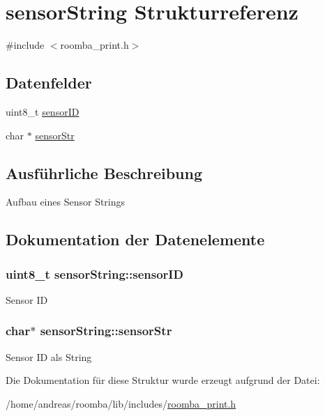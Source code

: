 \hypertarget{structsensorString}{\section{sensor\-String Strukturreferenz}
\label{structsensorString}
}


{\ttfamily \#include $<$roomba\-\_\-print.\-h$>$}

\subsection*{Datenfelder}
\begin{DoxyCompactItemize}
\item 
uint8\-\_\-t \hyperlink{structsensorString_a5a7f5dbee074486a9d560888b2a43fee}{sensor\-I\-D}
\item 
char $\ast$ \hyperlink{structsensorString_a68d9d4c7eecd21d9276b4ed569793d2f}{sensor\-Str}
\end{DoxyCompactItemize}


\subsection{Ausführliche Beschreibung}
Aufbau eines Sensor Strings 

\subsection{Dokumentation der Datenelemente}
\hypertarget{structsensorString_a5a7f5dbee074486a9d560888b2a43fee}{
\subsubsection[{sensor\-I\-D}]{\setlength{\rightskip}{0pt plus 5cm}uint8\-\_\-t sensor\-String\-::sensor\-I\-D}}\label{structsensorString_a5a7f5dbee074486a9d560888b2a43fee}
Sensor I\-D \hypertarget{structsensorString_a68d9d4c7eecd21d9276b4ed569793d2f}{
\subsubsection[{sensor\-Str}]{\setlength{\rightskip}{0pt plus 5cm}char$\ast$ sensor\-String\-::sensor\-Str}}\label{structsensorString_a68d9d4c7eecd21d9276b4ed569793d2f}
Sensor I\-D als String 

Die Dokumentation für diese Struktur wurde erzeugt aufgrund der Datei\-:\begin{DoxyCompactItemize}
\item 
/home/andreas/roomba/lib/includes/\hyperlink{roomba__print_8h}{roomba\-\_\-print.\-h}\end{DoxyCompactItemize}
